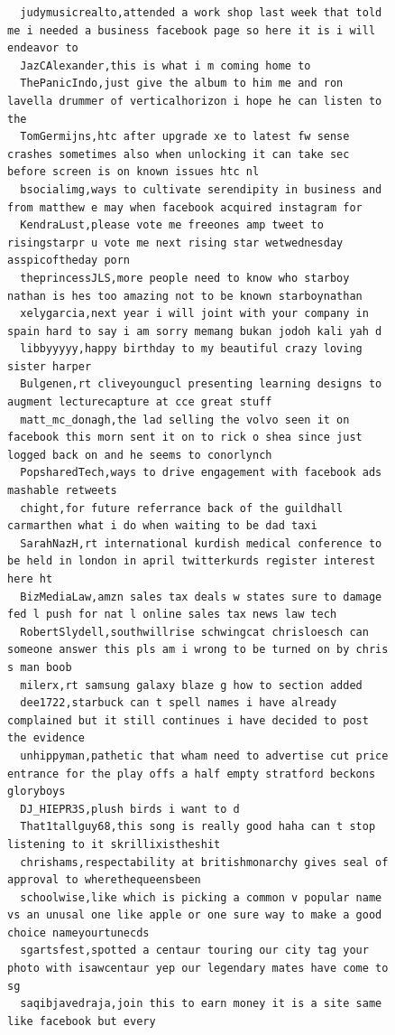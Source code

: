 \begin{figure}[htpb]
\begin{verbatim}
  judymusicrealto,attended a work shop last week that told me i needed a business facebook page so here it is i will endeavor to
  JazCAlexander,this is what i m coming home to
  ThePanicIndo,just give the album to him me and ron lavella drummer of verticalhorizon i hope he can listen to the
  TomGermijns,htc after upgrade xe to latest fw sense crashes sometimes also when unlocking it can take sec before screen is on known issues htc nl
  bsocialimg,ways to cultivate serendipity in business and from matthew e may when facebook acquired instagram for
  KendraLust,please vote me freeones amp tweet to risingstarpr u vote me next rising star wetwednesday asspicoftheday porn
  theprincessJLS,more people need to know who starboy nathan is hes too amazing not to be known starboynathan
  xelygarcia,next year i will joint with your company in spain hard to say i am sorry memang bukan jodoh kali yah d
  libbyyyyy,happy birthday to my beautiful crazy loving sister harper
  Bulgenen,rt cliveyoungucl presenting learning designs to augment lecturecapture at cce great stuff
  matt_mc_donagh,the lad selling the volvo seen it on facebook this morn sent it on to rick o shea since just logged back on and he seems to conorlynch
  PopsharedTech,ways to drive engagement with facebook ads mashable retweets
  chight,for future referrance back of the guildhall carmarthen what i do when waiting to be dad taxi
  SarahNazH,rt international kurdish medical conference to be held in london in april twitterkurds register interest here ht
  BizMediaLaw,amzn sales tax deals w states sure to damage fed l push for nat l online sales tax news law tech
  RobertSlydell,southwillrise schwingcat chrisloesch can someone answer this pls am i wrong to be turned on by chris s man boob
  milerx,rt samsung galaxy blaze g how to section added
  dee1722,starbuck can t spell names i have already complained but it still continues i have decided to post the evidence
  unhippyman,pathetic that wham need to advertise cut price entrance for the play offs a half empty stratford beckons gloryboys
  DJ_HIEPR3S,plush birds i want to d
  That1tallguy68,this song is really good haha can t stop listening to it skrillixistheshit
  chrishams,respectability at britishmonarchy gives seal of approval to wherethequeensbeen
  schoolwise,like which is picking a common v popular name vs an unusal one like apple or one sure way to make a good choice nameyourtunecds
  sgartsfest,spotted a centaur touring our city tag your photo with isawcentaur yep our legendary mates have come to sg
  saqibjavedraja,join this to earn money it is a site same like facebook but every

\end{verbatim}
\end{figure}
